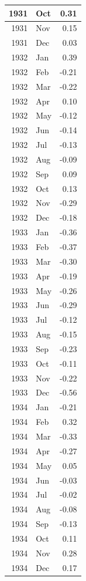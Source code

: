 \documentclass[
]{article}
\begin{document}
\begin{table}[H]
\begin{tabular}[t]{r|l|r}
\hline
1931 & Oct & 0.31\\
\hline
1931 & Nov & 0.15\\
\hline
1931 & Dec & 0.03\\
\hline
1932 & Jan & 0.39\\
\hline
1932 & Feb & -0.21\\
\hline
1932 & Mar & -0.22\\
\hline
1932 & Apr & 0.10\\
\hline
1932 & May & -0.12\\
\hline
1932 & Jun & -0.14\\
\hline
1932 & Jul & -0.13\\
\hline
1932 & Aug & -0.09\\
\hline
1932 & Sep & 0.09\\
\hline
1932 & Oct & 0.13\\
\hline
1932 & Nov & -0.29\\
\hline
1932 & Dec & -0.18\\
\hline
1933 & Jan & -0.36\\
\hline
1933 & Feb & -0.37\\
\hline
1933 & Mar & -0.30\\
\hline
1933 & Apr & -0.19\\
\hline
1933 & May & -0.26\\
\hline
1933 & Jun & -0.29\\
\hline
1933 & Jul & -0.12\\
\hline
1933 & Aug & -0.15\\
\hline
1933 & Sep & -0.23\\
\hline
1933 & Oct & -0.11\\
\hline
1933 & Nov & -0.22\\
\hline
1933 & Dec & -0.56\\
\hline
1934 & Jan & -0.21\\
\hline
1934 & Feb & 0.32\\
\hline
1934 & Mar & -0.33\\
\hline
1934 & Apr & -0.27\\
\hline
1934 & May & 0.05\\
\hline
1934 & Jun & -0.03\\
\hline
1934 & Jul & -0.02\\
\hline
1934 & Aug & -0.08\\
\hline
1934 & Sep & -0.13\\
\hline
1934 & Oct & 0.11\\
\hline
1934 & Nov & 0.28\\
\hline
1934 & Dec & 0.17\\

\end{tabular}
\end{table}
\end{document}

